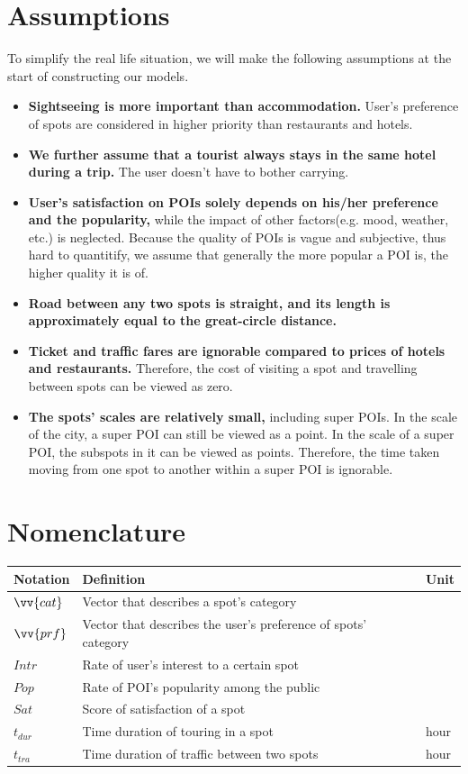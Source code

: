 \documentclass{mcmthesis}
\begin{document}
\section{Assumptions}\label{section:assumption}
  To simplify the real life situation, we will make the following assumptions at the start of constructing our models.
  \begin{itemize}
    \item \textbf{Sightseeing is more important than accommodation.} User's preference of spots are considered in higher priority than restaurants and hotels. 
    \item \textbf{We further assume that a tourist always stays in the same hotel during a trip.} The user doesn't have to bother carrying.
    \item \textbf{User's satisfaction on POIs solely depends on his/her preference and the popularity,} while the impact of other factors(e.g. mood, weather, etc.) is neglected. Because the quality of POIs is vague and subjective, thus hard to quantitify, we assume that generally the more popular a POI is, the higher quality it is of.
    \item \textbf{Road between any two spots is straight, and its length is approximately equal to the great-circle distance.}
    \item \textbf{Ticket and traffic fares are ignorable compared to prices of hotels and restaurants.} Therefore, the cost of visiting a spot and travelling between spots can be viewed as zero.
    \item \textbf{The spots' scales are relatively small,} including super POIs. In the scale of the city, a super POI can still be viewed as a point. In the scale of a super POI, the subspots in it can be viewed as points. Therefore, the time taken moving from one spot to another within a super POI is ignorable.
  \end{itemize}


\section{Nomenclature}
  \begin{tabular}{lll}    %
    \toprule
    Notation & Definition & Unit \\
    \midrule
    $\vv{cat}$ & Vector that describes a spot's category & \\
    $\vv{prf}$ & Vector that describes the user's preference of spots' category & \\
    $Intr$ & Rate of user's interest to a certain spot & \\
    $Pop$ & Rate of POI's popularity among the public & \\
    $Sat$ & Score of satisfaction of a spot & \\
    $t_{dur}$ & Time duration of touring in a spot & hour \\
    $t_{tra}$ & Time duration of traffic between two spots & hour \\
    \bottomrule
  \end{tabular}
\end{document}
